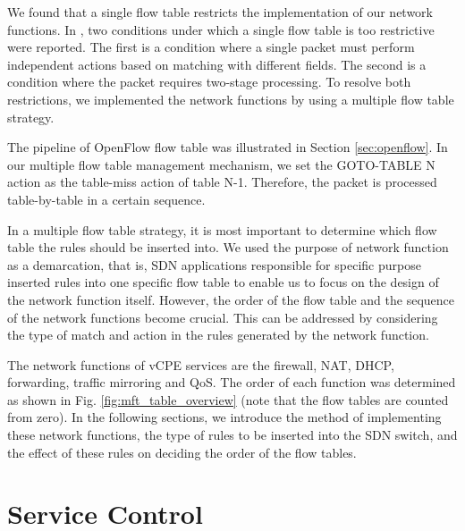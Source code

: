We found that a single flow table restricts the implementation of our network functions.
In \cite{multiple-flow-table}, two conditions under which a single flow table is too restrictive were reported.
The first is a condition where a single packet must perform independent actions based on matching with different fields.
The second is a condition where the packet requires two-stage processing.
To resolve both restrictions, we implemented the network functions by using a multiple flow table strategy.

The pipeline of OpenFlow flow table was illustrated in Section \ref{sec:openflow}.
In our multiple flow table management mechanism, we set the GOTO-TABLE N action as the table-miss action of table N-1. Therefore, the packet is processed table-by-table in a certain sequence.

In a multiple flow table strategy, it is most important to determine which flow table the rules should be inserted into.
We used the purpose of network function as a demarcation, that is, SDN applications responsible for specific purpose inserted rules into one specific flow table to enable us to focus on the design of the network function itself.
However, the order of the flow table and the sequence of the network functions become crucial.
This can be addressed by considering the type of match and action in the rules generated by the network function.

The network functions of vCPE services are the firewall, NAT, DHCP, forwarding, traffic mirroring and QoS.
The order of each function was determined as shown in Fig. \ref{fig:mft_table_overview} (note that the flow tables are counted from zero).
In the following sections, we introduce the method of implementing these network functions, the type of rules to be inserted into the SDN switch, and the effect of these rules on deciding the order of the flow tables.



\section{Service Control} \label{sec:service_control}

